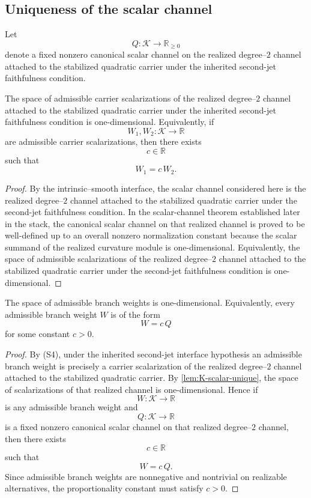 \subsection{Uniqueness of the scalar channel}
Let
\[
	Q:\mathcal K\to\mathbb R_{\ge0}
\]
denote a fixed nonzero canonical scalar channel on the realized
degree--\(2\) channel attached to the stabilized quadratic carrier
under the inherited second-jet faithfulness condition.
\begin{lemma}
	\label{lem:K-scalar-unique}
	The space of admissible carrier scalarizations of the realized
	degree--\(2\) channel attached to the stabilized quadratic carrier
	under the inherited second-jet faithfulness condition is
	one-dimensional.  Equivalently, if
	\[
		W_1,W_2:\mathcal K\to\mathbb R
	\]
	are admissible carrier scalarizations, then there exists
	\[
		c\in\mathbb R
	\]
	such that
	\[
		W_1=c\,W_2.
	\]
\end{lemma}
\begin{proof}
	By the intrinsic--smooth interface, the scalar channel considered here
	is the realized degree--\(2\) channel attached to the stabilized
	quadratic carrier under the second-jet faithfulness condition.  In the
	scalar-channel theorem established later in the stack, the canonical
	scalar channel on that realized channel is proved to be well-defined
	up to an overall nonzero normalization constant because the scalar
	summand of the realized curvature module is one-dimensional.
	Equivalently, the space of admissible scalarizations of the realized
	degree--\(2\) channel attached to the stabilized quadratic carrier
	under the second-jet faithfulness condition is one-dimensional.
\end{proof}
\begin{lemma}
	\label{lem:branch-weight-1d}
	The space of admissible branch weights is one-dimensional.
	Equivalently, every admissible branch weight \(W\) is of the form
	\[
		W=c\,Q
	\]
	for some constant \(c>0\).
\end{lemma}
\begin{proof}
	By \textup{(S4)}, under the inherited second-jet interface
	hypothesis an admissible branch weight is precisely a carrier
	scalarization of the realized degree--\(2\) channel attached to the
	stabilized quadratic carrier.  By \cref{lem:K-scalar-unique}, the
	space of scalarizations of that realized channel is one-dimensional.
	Hence if
	\[
		W:\mathcal K\to\mathbb R
	\]
	is any admissible branch weight and
	\[
		Q:\mathcal K\to\mathbb R
	\]
	is a fixed nonzero canonical scalar channel on that realized
	degree--\(2\) channel, then there exists
	\[
		c\in\mathbb R
	\]
	such that
	\[
		W=c\,Q.
	\]
	Since admissible branch weights are nonnegative and nontrivial on
	realizable alternatives, the proportionality constant must satisfy
	\(c>0\).
\end{proof}
